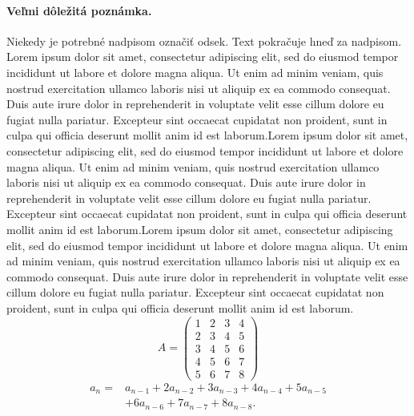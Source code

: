 \documentclass[10pt,twocolumn,twoside,slovak,a4paper]{article}
\begin{document}
\paragraph{Veľmi dôležitá poznámka.}
Niekedy je potrebné nadpisom označiť odsek. Text pokračuje hneď za nadpisom.
Lorem ipsum dolor sit amet, consectetur adipiscing elit, sed do eiusmod tempor incididunt ut labore et dolore magna aliqua. Ut enim ad minim veniam, quis nostrud exercitation ullamco laboris nisi ut aliquip ex ea commodo consequat. Duis aute irure dolor in reprehenderit in voluptate velit esse cillum dolore eu fugiat nulla pariatur. Excepteur sint occaecat cupidatat non proident, sunt in culpa qui officia deserunt mollit anim id est laborum.Lorem ipsum dolor sit amet, consectetur adipiscing elit, sed do eiusmod tempor incididunt ut labore et dolore magna aliqua. Ut enim ad minim veniam, quis nostrud exercitation ullamco laboris nisi ut aliquip ex ea commodo consequat. Duis aute irure dolor in reprehenderit in voluptate velit esse cillum dolore eu fugiat nulla pariatur. Excepteur sint occaecat cupidatat non proident, sunt in culpa qui officia deserunt mollit anim id est laborum.Lorem ipsum dolor sit amet, consectetur adipiscing elit, sed do eiusmod tempor incididunt ut labore et dolore magna aliqua. Ut enim ad minim veniam, quis nostrud exercitation ullamco laboris nisi ut aliquip ex ea commodo consequat. Duis aute irure dolor in reprehenderit in voluptate velit esse cillum dolore eu fugiat nulla pariatur. Excepteur sint occaecat cupidatat non proident, sunt in culpa qui officia deserunt mollit anim id est laborum.
\[A =
	\begin{pmatrix}
	1 & 2 & 3 & 4 \\
	2 & 3 & 4 & 5 \\
	3 & 4 & 5 & 6 \\
	4 & 5 & 6 & 7 \\
	5 & 6 & 7 & 8
	\end{pmatrix}
\]
\begin{align}
a_n ={}& a_{n-1} + 2a_{n-2} + 3a_{n-3}
       + 4a_{n-4} + 5a_{n-5} \nonumber\\
     &+ 6a_{n-6} + 7a_{n-7} + 8a_{n-8}.
\end{align}
\end{document}
